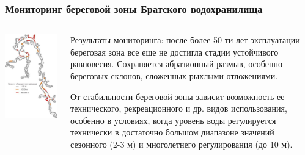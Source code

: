 \documentclass[10pt]{beamer}
\begin{document}
\begin{frame}[fragile]
  \frametitle{Мониторинг береговой зоны Братского водохранилища}
  \begin{columns}
    \begin{column}{0.4\linewidth}
      \includegraphics[width=\linewidth]{bratsk-reserv-shores.jpeg}
    \end{column}
    \begin{column}{0.6\linewidth}
      Результаты мониторинга: после более 50-ти лет эксплуатации  береговая зона все еще не достигла стадии устойчивого равновесия.  Сохраняется абразионный размыв, особенно береговых склонов, сложенных рыхлыми отложениями.

\vspace{1em}
От стабильности береговой зоны зависит возможность ее технического, рекреационного и др. видов использования, особенно в условиях, когда уровень воды регулируется технически в достаточно большом диапазоне значений сезонного (2-3 м) и многолетнего регулирования (до 10 м).
    \end{column}
  \end{columns}
\end{frame}
\end{document}
